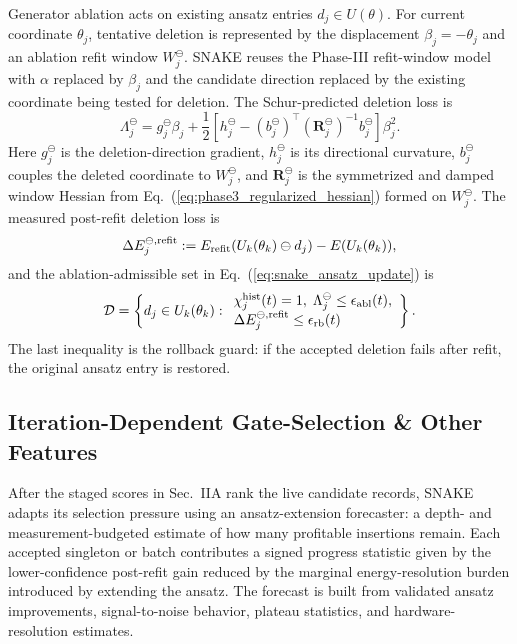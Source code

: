 \documentclass[
  reprint,
  amsmath,
  amssymb,
  aps,
  pra,
  nofootinbib,
  superscriptaddress,
  floatfix
]{revtex4-2}
\begin{document}
Generator ablation acts on existing ansatz entries $d_j\in U(\theta)$. For current coordinate $\theta_j$, tentative deletion is represented by the displacement $\beta_j=-\theta_j$ and an ablation refit window $W_j^\ominus$.  SNAKE reuses the Phase-III refit-window model with $\alpha$ replaced by $\beta_j$ and the candidate direction replaced by the existing coordinate being tested for deletion.  The Schur-predicted deletion loss is
\begin{equation}
\Lambda_j^\ominus
=
g_j^\ominus\beta_j
+\frac12
\left[
h_j^\ominus
-(b_j^\ominus)^{\top}(\mathbf R_j^\ominus)^{-1}b_j^\ominus
\right]\beta_j^2 .
\label{eq:ablation_schur_loss}
\end{equation}
Here $g_j^\ominus$ is the deletion-direction gradient, $h_j^\ominus$ is its directional curvature, $b_j^\ominus$ couples the deleted coordinate to $W_j^\ominus$, and $\mathbf R_j^\ominus$ is the symmetrized and damped window Hessian from Eq.~(\ref{eq:phase3_regularized_hessian}) formed on $W_j^\ominus$.  The measured post-refit deletion loss is
\begin{equation}
\Delta E_j^{\ominus,{\rm refit}}
:=
E_{\rm refit}(U_k(\theta_k)\ominus d_j)-E(U_k(\theta_k)),
\label{eq:ablation_refit_loss}
\end{equation}
and the ablation-admissible set in Eq.~(\ref{eq:snake_ansatz_update}) is
\begin{equation}
\mathcal D
=
\left\{
d_j\in U_k(\theta_k):
\begin{array}{l}
\chi_j^{\rm hist}(t)=1,\;
\Lambda_j^\ominus\le\epsilon_{\rm abl}(t),\\
\Delta E_j^{\ominus,{\rm refit}}\le\epsilon_{\rm rb}(t)
\end{array}
\right\}.
\label{eq:ablation_admissible_set}
\end{equation}
The last inequality is the rollback guard: if the accepted deletion fails after refit, the original ansatz entry is restored.

\subsection{Iteration-Dependent Gate-Selection \& Other Features}

After the staged scores in Sec.~IIA rank the live candidate records, SNAKE adapts its selection pressure using an ansatz-extension forecaster: a depth- and measurement-budgeted estimate of how many profitable insertions remain. Each accepted singleton or batch contributes a signed progress statistic given by the lower-confidence post-refit gain reduced by the marginal energy-resolution burden introduced by extending the ansatz. The forecast is built from validated ansatz improvements, signal-to-noise behavior, plateau statistics, and hardware-resolution estimates.
\end{document}

